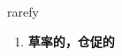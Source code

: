 
\begin{frame}
{\huge rarefy}
\begin{center}
\begin{enumerate}\Large
  \item \textbf{草率的，仓促的}
\end{enumerate}
\end{center}
\end{frame}
